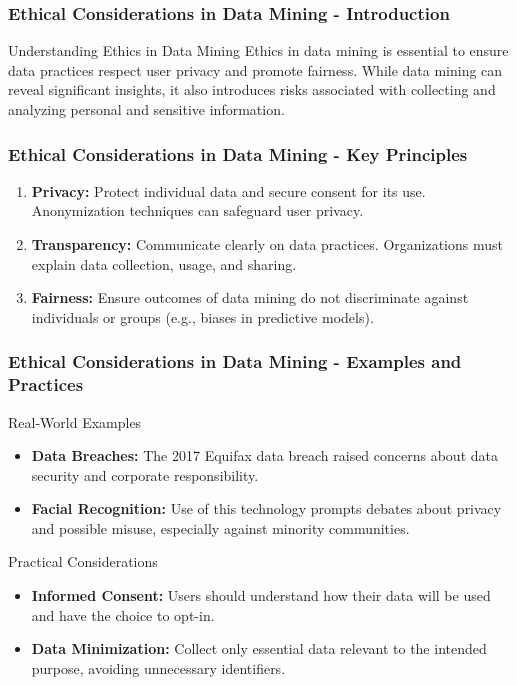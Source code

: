 \documentclass[aspectratio=169]{beamer}
\begin{document}
\begin{frame}[fragile]
    \frametitle{Ethical Considerations in Data Mining - Introduction}
    \begin{block}{Understanding Ethics in Data Mining}
        Ethics in data mining is essential to ensure data practices respect user privacy and promote fairness. While data mining can reveal significant insights, it also introduces risks associated with collecting and analyzing personal and sensitive information.
    \end{block}
\end{frame}

\begin{frame}[fragile]
    \frametitle{Ethical Considerations in Data Mining - Key Principles}
    \begin{enumerate}
        \item \textbf{Privacy:} Protect individual data and secure consent for its use. Anonymization techniques can safeguard user privacy.
        \item \textbf{Transparency:} Communicate clearly on data practices. Organizations must explain data collection, usage, and sharing.
        \item \textbf{Fairness:} Ensure outcomes of data mining do not discriminate against individuals or groups (e.g., biases in predictive models).
    \end{enumerate}
\end{frame}

\begin{frame}[fragile]
    \frametitle{Ethical Considerations in Data Mining - Examples and Practices}
    \begin{block}{Real-World Examples}
        \begin{itemize}
            \item \textbf{Data Breaches:} The 2017 Equifax data breach raised concerns about data security and corporate responsibility.
            \item \textbf{Facial Recognition:} Use of this technology prompts debates about privacy and possible misuse, especially against minority communities.
        \end{itemize}
    \end{block}
    
    \begin{block}{Practical Considerations}
        \begin{itemize}
            \item \textbf{Informed Consent:} Users should understand how their data will be used and have the choice to opt-in.
            \item \textbf{Data Minimization:} Collect only essential data relevant to the intended purpose, avoiding unnecessary identifiers.
        \end{itemize}
    \end{block}
\end{frame}
\end{document}
